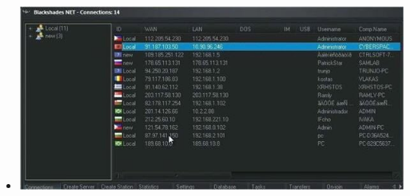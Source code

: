 \documentclass{beamer}
\begin{document}
\section{}
  \begin{frame}{}
  \begin{itemize}
	\item
	 \includegraphics[scale=.5]{blackshades.jpeg}
  \end{itemize}
  \end{frame}
\end{document}
